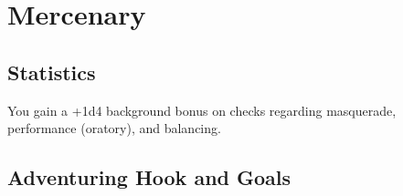 \section{Mercenary}\label{background:mercenary}

\subsection{Statistics}
You gain a +1d4 background bonus on checks regarding masquerade, performance (oratory), and balancing.

\subsection{Adventuring Hook and Goals}
